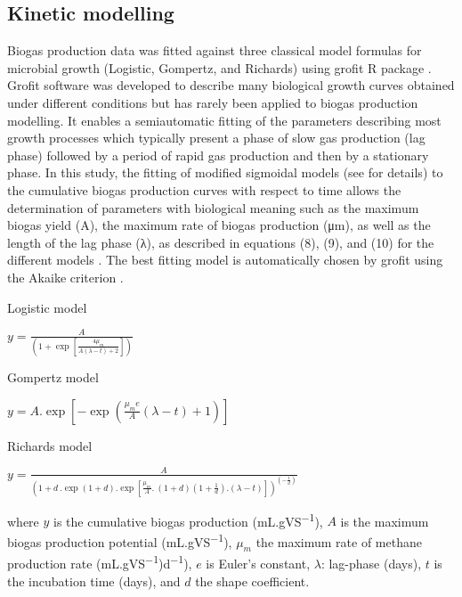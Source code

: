 \subsection{Kinetic modelling}
Biogas production data was fitted against three classical model formulas for microbial growth (Logistic, Gompertz, and Richards) using grofit R package \cite{Kahm_2010}. Grofit software was developed to describe many biological growth curves obtained under different conditions but has rarely been applied to biogas production modelling. It enables a semiautomatic fitting of the parameters describing most growth processes which typically present a phase of slow gas production (lag phase) followed by a period of rapid gas production and then by a stationary phase. In this study, the fitting of modified sigmoidal models (see \cite{Zwietering1990} for details) to the cumulative biogas production curves with respect to time allows the determination of parameters with biological meaning such as the maximum biogas yield (A), the maximum rate of biogas production (μm), as well as the length of the lag phase (λ), as described in equations (8), (9), and (10) for the different models \cite{Zwietering1990,Ware_2017,Alta__2009}. The best fitting model is automatically chosen by grofit using the Akaike criterion \cite{Hasenbrink_2006}.

Logistic model

\(y=\frac{A}{\left(1+\exp\left[\frac{4\mu_m}{A\left(\lambda-t\right)+2}\right]\right)}\)

Gompertz model

\(y=A.\exp\left[-\exp\left(\frac{\mu_me}{A}\left(\lambda-t\right)+1\right)\right]\)

Richards model

\(y=\frac{A}{\left(1+d\ .\exp\left(1+d\right).\exp\left[\frac{\mu_m}{A}.\ \left(1+d\right)\left(1+\frac{1}{d}\right).\left(\lambda-t\right)\right]\right)^{\left(-\frac{1}{d}\right)}}\)

where $y$ is the cumulative biogas production (mL.gVS\textsuperscript{−1}), $A$ is the maximum biogas production potential (mL.gVS\textsuperscript{−1}), $μ_m$ the maximum rate of methane production rate (mL.gVS\textsuperscript{−1})d\textsuperscript{−1}), $e$ is Euler's constant, $λ$: lag-phase (days), $t$ is the incubation time (days), and $d$ the shape coefficient.